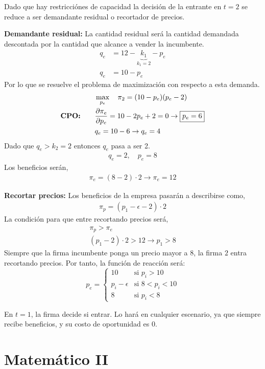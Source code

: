 \documentclass{exam}
\begin{document}
\begin{solution}
    Dado que hay restricciónes de capacidad la decisión de la entrante en $t = 2$ se reduce a ser demandante residual o recortador de precios. 

    \noindent
\begin{minipage}{0.45\textwidth}
    \textbf{Demandante residual:}\newline
    La cantidad residual será la cantidad demandada descontada por la cantidad que alcance a vender la incumbente. 
    \begin{align*}
        q_e &= 12 - \underbrace{k_1}_{k_1 = 2} - p_e \\
        q_e &= 10 - p_e 
    \end{align*}
    Por lo que se resuelve el problema de maximización con respecto a esta demanda. 
    \begin{align*}
        &\max_{p_e} \quad \pi_2 = (10-p_e)(p_e-2) \\
        \textbf{CPO:} \qquad &\pdv{\pi_e}{p_e} = 10-2p_e + 2 = 0 \rightarrow \boxed{p_e = 6}\\
        &q_e = 10 - 6 \to q_e = 4
    \end{align*}
    Dado que $q_e > k_2 = 2$ entonces $q_e$ pasa a ser 2. 
    \begin{align*}
        \boxed{q_e = 2, \quad p_e = 8}
    \end{align*}
    Los beneficios serán, 
    \begin{align*}
        \pi_e = (8-2)\cdot 2 \to \boxed{\pi_e = 12}
    \end{align*}
\end{minipage}%
\hfill%
\vrule width 1pt
\hfill%
\begin{minipage}{0.45\textwidth}
    \textbf{Recortar precios:}\newline
    Los beneficios de la empresa pasarán a describirse como,
    \begin{align*}
        \pi_p = (p_1-\epsilon -2) \cdot 2
    \end{align*}
    La condición para que entre recortando precios será,
    \begin{align*}
        \pi_p > \pi_e \\
        (p_1 - 2) \cdot 2 > 12 \to \boxed{p_1 > 8}
    \end{align*}
    Siempre que la firma incumbente ponga un precio mayor a $8$, la firma $2$ entra recortando precios. Por tanto, la función de reacción será:
    \[
        p_e =
        \begin{cases} 
        10 & \text{si } p_i > 10 \\
        p_i - \epsilon & \text{si } 8 < p_i < 10 \\
        8 & \text{si } p_i < 8
        \end{cases}
    \]
\end{minipage}
\vspace{3mm}
En \(t = 1\), la firma decide si entrar. Lo hará en cualquier escenario, ya que siempre recibe beneficios, y su costo de oportunidad es $0$.

\end{solution}



\section{Matemático II}
\end{document}
